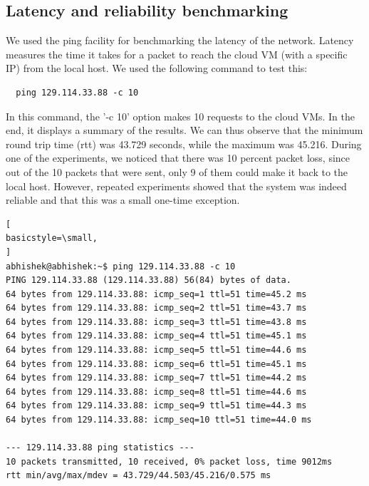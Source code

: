 \documentclass[9pt,twocolumn,twoside]{../../styles/osajnl}
\begin{document}
\subsection{Latency and reliability benchmarking}
We used the ping facility for benchmarking the latency
\cite{measuring-latency} of the network.  Latency measures the time it
takes for a packet to reach the cloud VM (with a specific IP) from the
local host.  We used the following command to test this:

\begin{lstlisting}
  ping 129.114.33.88 -c 10
\end{lstlisting}
	
In this command, the '-c 10' option makes 10 requests to the cloud
VMs.  In the end, it displays a summary of the results.  We can thus
observe that the minimum round trip time (rtt) was 43.729 seconds,
while the maximum was 45.216.  During one of the experiments, we noticed
that there was 10 percent packet loss, since out of the 10 packets
that were sent, only 9 of them could make it back to the local host.
However, repeated experiments showed that the system was indeed
reliable and that this was a small one-time exception.  

\begin{lstlisting}[
basicstyle=\small,
]
abhishek@abhishek:~$ ping 129.114.33.88 -c 10
PING 129.114.33.88 (129.114.33.88) 56(84) bytes of data.
64 bytes from 129.114.33.88: icmp_seq=1 ttl=51 time=45.2 ms
64 bytes from 129.114.33.88: icmp_seq=2 ttl=51 time=43.7 ms
64 bytes from 129.114.33.88: icmp_seq=3 ttl=51 time=43.8 ms
64 bytes from 129.114.33.88: icmp_seq=4 ttl=51 time=45.1 ms
64 bytes from 129.114.33.88: icmp_seq=5 ttl=51 time=44.6 ms
64 bytes from 129.114.33.88: icmp_seq=6 ttl=51 time=45.1 ms
64 bytes from 129.114.33.88: icmp_seq=7 ttl=51 time=44.2 ms
64 bytes from 129.114.33.88: icmp_seq=8 ttl=51 time=44.6 ms
64 bytes from 129.114.33.88: icmp_seq=9 ttl=51 time=44.3 ms
64 bytes from 129.114.33.88: icmp_seq=10 ttl=51 time=44.0 ms

--- 129.114.33.88 ping statistics ---
10 packets transmitted, 10 received, 0% packet loss, time 9012ms
rtt min/avg/max/mdev = 43.729/44.503/45.216/0.575 ms
\end{lstlisting}
\end{document}
